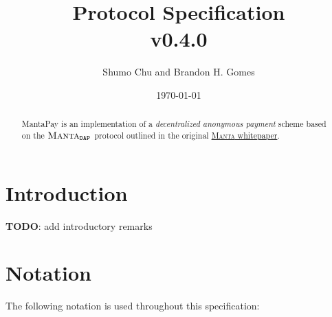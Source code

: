 \documentclass[a4paper]{article}
\title{\textbf{\MantaPay{} Protocol Specification}\\ v0.4.0}
\author{Shumo Chu and Brandon H. Gomes}
\date{\today}
\newcommand{\lsection}[2]{\def\sectionlabel{#2} \section{#1}\label{sec:#2}}
\newcommand{\TODO}[1]{{\color{red}\textbf{TODO}}: #1}
\theoremstyle{definition}
\newcommand{\MantaDAP}{{\Manta{}_{\texttt{DAP}}}}
\newcommand{\MantaPay}{{\textsf{MantaPay}}}
\newcommand{\Manta}{{\textsc{Manta}}}
\begin{document}
    
\maketitle

\begin{abstract}
    \MantaPay{} is an implementation of a \emph{decentralized anonymous payment} scheme based on the $\MantaDAP$ protocol outlined in the original \href{https://eprint.iacr.org/2021/743.pdf}{\Manta{} whitepaper}.
\end{abstract}
    
\tableofcontents

\lsection{Introduction}{introduction}

\TODO{add introductory remarks}

\lsection{Notation}{notation}

The following notation is used throughout this specification:
\end{document}
